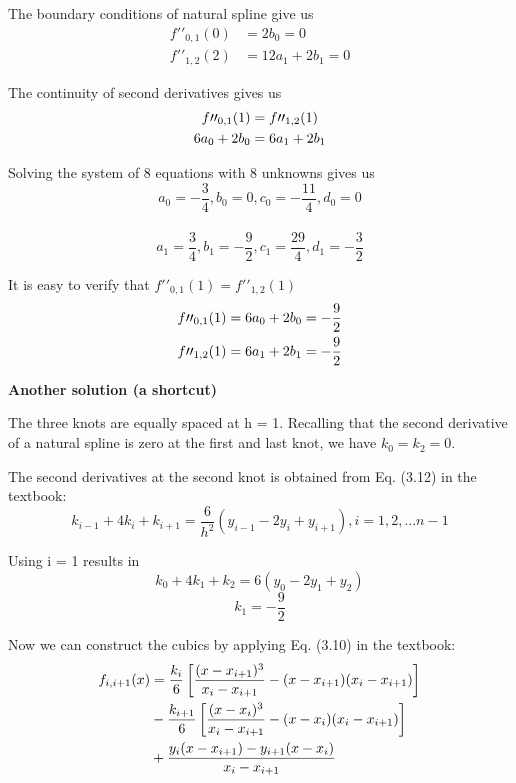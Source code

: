 \begin{exercise}{4}
The boundary conditions of natural spline give us
\begin{align}
f\prime\prime_{0,1}(0) &= 2b_0 = 0\\
f\prime\prime_{1,2}(2) &= 12a_1 + 2b_1 = 0
\end{align}

The continuity of second derivatives gives us
\begin{align}
\notag
f\prime\prime_{0,1}(1) &= f\prime\prime_{1,2}(1)\\
 6a_0 + 2b_0 &= 6a_1 + 2b_1
\end{align}

Solving the system of 8 equations with 8 unknowns gives us \\
$$a_0=-\frac{3}{4},b_0=0,c_0=-\frac{11}{4},d_0=0$$\\
$$a_1=\frac{3}{4},b_1=-\frac{9}{2},c_1=\frac{29}{4},d_1=-\frac{3}{2}$$

It is easy to verify that $f\prime\prime_{0,1}(1) = f\prime\prime_{1,2}(1)$
\begin{align}
\notag
f\prime\prime_{0,1}(1) &= 6a_0 + 2b_0 = -\frac{9}{2}\\
\notag
f\prime\prime_{1,2}(1) &= 6a_1 + 2b_1 = -\frac{9}{2}
\end{align}

\textbf{Another solution (a shortcut)}

The three knots are equally spaced at h = 1. Recalling that the second
derivative of a natural spline is zero at the first and last knot, we have $k_0 = k_2 = 0$. 

The second derivatives at the second knot is obtained from Eq. (3.12) in the textbook:
$$k_{i-1}+4k_i+k_{i+1}=\frac{6}{h^2}(y_{i-1}-2y_i+y_{i+1}), i=1,2,...n-1$$

Using i = 1 results in
$$k_0+4k_1+k_2=6(y_0-2y_1+y_2)$$
$$k_1=-\frac{9}{2}$$

Now we can construct the cubics by applying Eq. (3.10) in the textbook:
\begin{align}
\notag
f_{i,i+1}(x) &= \frac{k_i}{6}\left[\frac{(x-x_{i+1})^3}{x_i-x_{i+1}}-(x-x_{i+1})(x_i-x_{i+1})\right]\\ 
\notag
& - \frac{k_{i+1}}{6}\left[\frac{(x-x_i)^3}{x_i-x_{i+1}}-(x-x_i)(x_i-x_{i+1})\right]\\ 
\notag
& + \frac{y_i(x-x_{i+1})-y_{i+1}(x-x_i)}{x_i-x_{i+1}}
\end{align}


\end{exercise}
